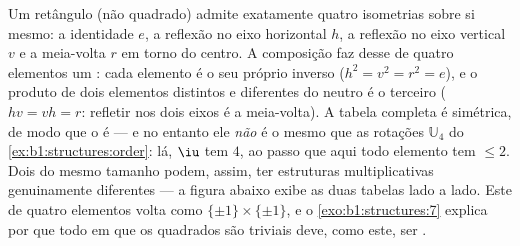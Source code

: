\begin{example}\label{ex:b1:structures:klein}
Um retângulo (não quadrado) admite exatamente quatro isometrias sobre
si mesmo: a identidade $e$, a reflexão no eixo horizontal $h$, a
reflexão no eixo vertical $v$ e a meia-volta $r$ em torno do
centro. A composição faz desse  de quatro elementos um :
cada elemento é o seu próprio inverso ($h^2 = v^2 = r^2 = e$), e o
produto de dois elementos distintos e diferentes do neutro é o terceiro
($hv = vh = r$: refletir nos dois eixos é a meia-volta). A
tabela completa é simétrica, de modo que o  é  --- e no
entanto ele \emph{não} é o mesmo  que as rotações $\mathbb U_4$ do
\cref{ex:b1:structures:order}: lá, $\iu$ tem  $4$, ao passo que
aqui todo elemento tem  $\leq 2$. Dois  do mesmo
tamanho podem, assim, ter estruturas multiplicativas genuinamente
diferentes --- a figura abaixo exibe as duas tabelas lado a lado. Este
 de quatro elementos volta como $\{\pm1\} \times \{\pm1\}$, e o
\cref{exo:b1:structures:7} explica por que todo  em que os
quadrados são triviais deve, como este, ser .
\end{example}

